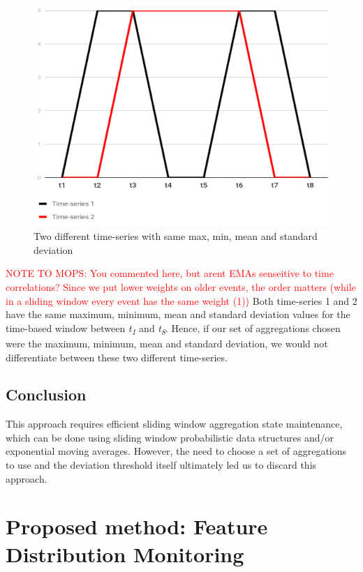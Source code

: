 \begin{figure}[!htb]
    \begin{center}
      \includegraphics[scale=0.7]{figures/approach2-timeseries.png}
      \caption[]{Two different time-series with same max, min, mean and standard deviation}
      \label{fig:approach2-timeseries}
    \end{center}
\end{figure}

\textcolor{red}{NOTE TO MOPS: You commented here, but arent EMAs senseitive to time correlations? Since we put lower weights on older events, the order matters (while in a sliding window every event has the same weight (1))}
Both time-series 1 and 2 have the same maximum, minimum, mean and standard deviation values for the time-based window between \textit{t\textsubscript{1}} and \textit{t\textsubscript{8}}. Hence, if our set of aggregations chosen were the maximum, minimum, mean and standard deviation, we would not differentiate between these two different time-series.

\subsection*{Conclusion}
This approach requires efficient sliding window aggregation state maintenance, which can be done using sliding window probabilistic data structures and/or exponential moving averages. However, the need to choose a set of aggregations to use and the deviation threshold itself ultimately led us to discard this approach.


\section{Proposed method: Feature Distribution Monitoring} \label{sec:ft-monitoring}

